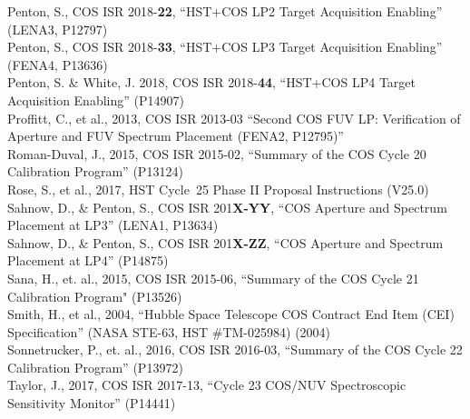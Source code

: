 \documentclass{stsci_report}
\newcommand{\pid}[1]{{\rm P}#1}
\begin{document}
Penton, S., COS ISR 2018-{\bf 22}, ``HST+COS LP2 Target Acquisition Enabling'' (LENA3, \pid{12797})\\
Penton, S., COS ISR 2018-{\bf 33}, ``HST+COS LP3 Target Acquisition Enabling'' (FENA4, \pid{13636})\\
Penton, S. \& White, J. 2018, COS ISR 2018-{\bf 44}, ``HST+COS LP4 Target Acquisition Enabling'' (\pid{14907})\\
Proffitt, C., et al., 2013, COS ISR 2013-03  ``Second COS FUV LP: Verification of Aperture and FUV Spectrum Placement (FENA2, \pid{12795})''\\
Roman-Duval, J., 2015, COS ISR 2015-02, ``Summary of the COS Cycle 20 Calibration Program'' (\pid{13124})\\
Rose, S., et al., 2017, HST Cycle~25 Phase II Proposal Instructions (V25.0)\\
Sahnow, D., \& Penton, S., COS ISR 201{\bf X-YY}, ``COS Aperture and Spectrum Placement at LP3'' (LENA1, \pid{13634})\\
Sahnow, D., \& Penton, S., COS ISR 201{\bf X-ZZ}, ``COS Aperture and Spectrum Placement at LP4'' (\pid{14875})\\
Sana, H., et. al., 2015, COS ISR 2015-06, ``Summary of the COS Cycle 21 Calibration Program" (\pid{13526})\\
Smith, H., et al., 2004, ``Hubble Space Telescope COS Contract End Item (CEI) Specification'' (NASA STE-63, HST \#TM-025984) (2004)\\
Sonnetrucker, P., et. al., 2016, COS ISR 2016-03, ``Summary of the COS Cycle 22 Calibration Program'' (\pid{13972}) \\
Taylor, J., 2017, COS ISR 2017-13, ``Cycle 23 COS/NUV Spectroscopic Sensitivity Monitor'' (\pid{14441})\\
\normalsize
\newpage
\clearpage
%
\end{document}
